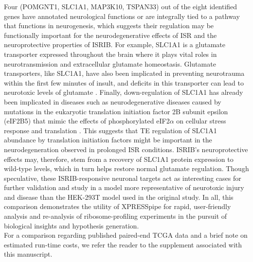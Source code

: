 \documentclass[10pt, oneside]{article}
\begin{document}
Four (POMGNT1, SLC1A1, MAP3K10, TSPAN33) out of the eight identified genes have annotated neurological functions or are integrally tied to a pathway that functions in neurogenesis, which suggests their regulation may be functionally important for the neurodegenerative effects of ISR and the neuroprotective properties of ISRIB. For example, SLC1A1 is a glutamate transporter expressed throughout the brain where it plays vital roles in \\neurotransmission and extracellular glutamate homeostasis. Glutamate transporters, like SLC1A1, have also been implicated in preventing neurotrauma within the first few minutes of insult, and deficits in this transporter can lead to neurotoxic levels of glutamate \cite{slc1a1_neurotoxic}. Finally, down-regulation of SLC1A1 has already been implicated in diseases such as neurodegenerative diseases caused by mutations in the eukaryotic translation initiation factor 2B subunit epsilon (eIF2B5) that mimic the effects of phosphorylated eIF2$\alpha$ on cellular stress response and translation \cite{eif2b_neuroprotective, isrib_riboseq, isrib_structure}. This suggests that TE regulation of SLC1A1 abundance by translation initiation factors might be important in the neurodegeneration observed in prolonged ISR conditions. ISRIB's neuroprotective effects may, therefore, stem from a recovery of SLC1A1 protein expression to wild-type levels, which in turn helps restore normal glutamate regulation. Though speculative, these ISRIB-responsive neuronal targets act as interesting cases for further validation and study in a model more representative of neurotoxic injury and disease than the HEK-293T model used in the original study. In all, this comparison demonstrates the utility of XPRESSpipe for rapid, user-friendly analysis and re-analysis of ribosome-profiling experiments in the pursuit of biological insights and hypothesis generation. \\

\noindent
For a comparison regarding published paired-end TCGA data and a brief note on estimated run-time costs, we refer the reader to the supplement associated with this manuscript.\\
\end{document}
